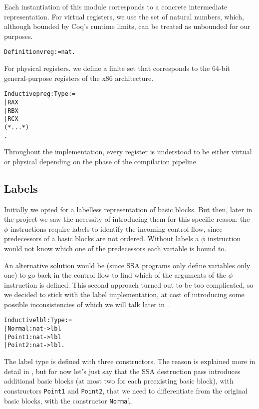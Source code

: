 Each instantiation of this module corresponds to a concrete intermediate representation. For virtual registers, we use the set of natural numbers, which, although bounded by Coq's runtime limits, can be treated as unbounded for our purposes.

\begin{alltt}
Definition vreg := nat.
\end{alltt}

For physical registers, we define a finite set that corresponds to the 64-bit general-purpose registers of the x86 architecture.

\begin{alltt}
Inductive preg : Type :=
  | RAX
  | RBX
  | RCX
  (* ... *)
.
\end{alltt}

Throughout the implementation, every register is understood to be either virtual or physical depending on the phase of the compilation pipeline.

\subsection{Labels}

Initially we opted for a labelless representation of basic blocks.
But then, later in the project we saw the necessity of introducing them for this specific reason: the $\phi$ instructions require labels to identify the incoming control flow, since predecessors of a basic blocks are not ordered. Without labels a $\phi$ instruction would not know which one of the predecessors each variable is bound to.

An alternative solution would be (since SSA programs only define variables only one) to go back in the control flow to find which of the arguments of the $\phi$ instruction is defined. This second approach turned out to be too complicated, so we decided to stick with the label implementation, at cost of introducing some possible inconsistencies of which we will talk later in .

\begin{alltt}
Inductive lbl : Type :=
  | Normal : nat -> lbl
  | Point1 : nat -> lbl
  | Point2 : nat -> lbl.
\end{alltt}

The label type is defined with three constructors. The reason is explained more in detail in , but for now let's just say that the SSA destruction pass introduces additional basic blocks (at most two for each preexisting basic block), with constructors \texttt{Point1} and \texttt{Point2}, that we need to differentiate from the original basic blocks, with the constructor \texttt{Normal}.

